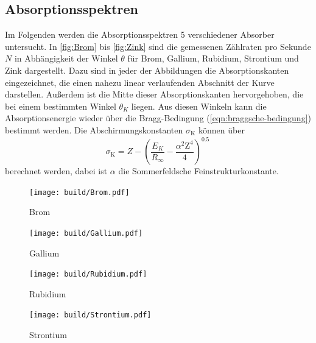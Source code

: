 \subsection{Absorptionsspektren}
Im Folgenden werden die Absorptionsspektren 5 verschiedener Absorber untersucht. In \autoref{fig:Brom} bis \autoref{fig:Zink} sind die gemessenen Zählraten pro Sekunde $N$ in Abhängigkeit der Winkel $\theta$ für Brom, Gallium, Rubidium, Strontium und Zink dargestellt. Dazu sind in jeder der Abbildungen die Absorptionskanten eingezeichnet, die einen nahezu linear verlaufenden Abschnitt der Kurve darstellen. Außerdem ist die Mitte dieser Absorptionskanten hervorgehoben, die bei einem bestimmten Winkel $\theta_K$ liegen. Aus diesen Winkeln kann die Absorptionsenergie wieder über die Bragg-Bedingung (\autoref{eqn:braggsche-bedingung}) bestimmt werden. Die Abschirmungskonstanten $\sigma_\text{K}$ können über 
\begin{equation}
    \sigma_\text{K} = Z - \left(\frac{E_K}{R_\infty} - \frac{\alpha^2 \text{Z}^4}{4}\right)^{0.5} \, 
    \label{eqn:sigmaK}
\end{equation}
\noindent
berechnet werden, dabei ist $\alpha$ die Sommerfeldsche Feinstrukturkonstante.
\begin{figure}[H]
  \centering
  \texttt{[image: build/Brom.pdf]}
  \caption{Brom}
  \label{fig:Brom}
\end{figure}

\begin{figure}[H]
  \centering
  \texttt{[image: build/Gallium.pdf]}
  \caption{Gallium}
  \label{fig:Gallium}
\end{figure}

\begin{figure}[H]
  \centering
  \texttt{[image: build/Rubidium.pdf]}
  \caption{Rubidium}
  \label{fig:Rubidium}
\end{figure}

\begin{figure}[H]
  \centering
  \texttt{[image: build/Strontium.pdf]}
  \caption{Strontium}
  \label{fig:Strontium}
\end{figure}

